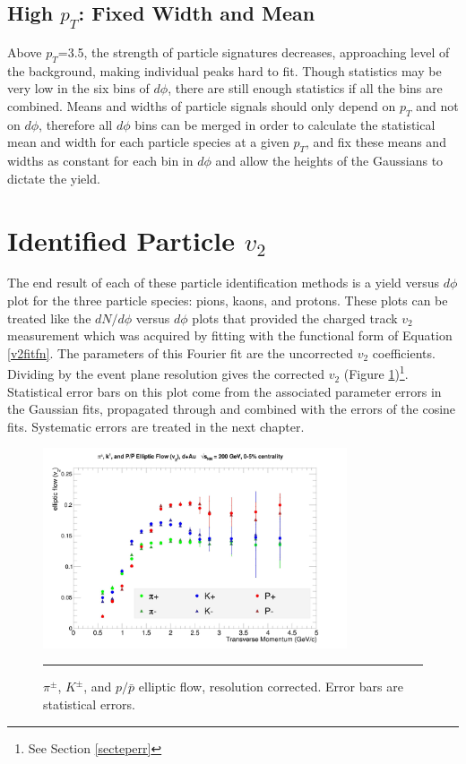 \subsection{High $p_T$: Fixed Width and Mean}
Above $p_T$=3.5, the strength of particle signatures decreases, approaching level of the background, making individual peaks hard to fit. Though statistics may be very low in the six bins of $d\phi$, there are still enough statistics if all the bins are combined. Means and widths of particle signals should only depend on $p_T$ and not on $d\phi$, therefore all $d\phi$ bins can be merged in order to calculate the statistical mean and width for each particle species at a given $p_T$, and fix these means and widths as constant for each bin in $d\phi$ and allow the heights of the Gaussians to dictate the yield.

\section{Identified Particle $v_{2}$}
The end result of each of these particle identification methods is a yield versus $d\phi$ plot for the three particle species: pions, kaons, and protons. These plots can be treated like the $dN/d\phi$ versus $d\phi$ plots that provided the charged track $v_2$ measurement which was acquired by fitting with the functional form of Equation \ref{v2fitfn}. The parameters of this Fourier fit are the uncorrected $v_2$ coefficients. Dividing by the event plane resolution gives the corrected $v_2$ (Figure \ref{fig:v2all})\footnote{See Section \ref{secteperr}}. Statistical error bars on this plot come from the associated parameter errors in the Gaussian fits, propagated through and combined with the errors of the cosine fits. Systematic errors are treated in the next chapter.
\begin{figure}[H]
  \centering
    \includegraphics[width=0.8\textwidth]{results/v2allnoSE.jpg}
    \rule{35em}{0.5pt}
  \caption[$\pi^{\pm}$, $K^{\pm}$, $p/\bar{p}$ elliptic flow,$\sqrt{s_{NN}}=$200 GeV d+Au collisions]{$\pi^{\pm}$, $K^{\pm}$, and $p/\bar{p}$ elliptic flow, resolution corrected. Error bars are statistical errors.}
  \label{fig:v2all}
\end{figure}

\pagebreak
\pagebreak
